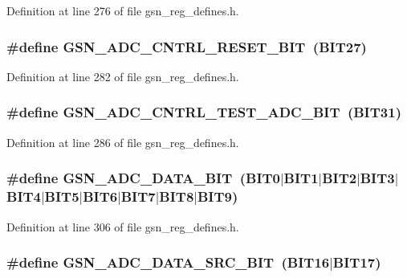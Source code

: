 Definition at line 276 of file gsn\_\-reg\_\-defines.h.

\hypertarget{a00546_a0fc6f6aa9f2c82b8c88736603f42b6cd}{
\subsubsection[{GSN\_\-ADC\_\-CNTRL\_\-RESET\_\-BIT}]{\setlength{\rightskip}{0pt plus 5cm}\#define GSN\_\-ADC\_\-CNTRL\_\-RESET\_\-BIT~(BIT27)}}
\label{a00546_a0fc6f6aa9f2c82b8c88736603f42b6cd}


Definition at line 282 of file gsn\_\-reg\_\-defines.h.

\hypertarget{a00546_aab5f311c3b1d2f7dab79d1f7a990ef0d}{
\subsubsection[{GSN\_\-ADC\_\-CNTRL\_\-TEST\_\-ADC\_\-BIT}]{\setlength{\rightskip}{0pt plus 5cm}\#define GSN\_\-ADC\_\-CNTRL\_\-TEST\_\-ADC\_\-BIT~(BIT31)}}
\label{a00546_aab5f311c3b1d2f7dab79d1f7a990ef0d}


Definition at line 286 of file gsn\_\-reg\_\-defines.h.

\hypertarget{a00546_aca0bee2cec66890da6f7a254341d5b25}{
\subsubsection[{GSN\_\-ADC\_\-DATA\_\-BIT}]{\setlength{\rightskip}{0pt plus 5cm}\#define GSN\_\-ADC\_\-DATA\_\-BIT~(BIT0$|$BIT1$|$BIT2$|$BIT3$|$BIT4$|$BIT5$|$BIT6$|$BIT7$|$BIT8$|$BIT9)}}
\label{a00546_aca0bee2cec66890da6f7a254341d5b25}


Definition at line 306 of file gsn\_\-reg\_\-defines.h.

\hypertarget{a00546_a3d8d67e6f614ba0e4932e0901848264c}{
\subsubsection[{GSN\_\-ADC\_\-DATA\_\-SRC\_\-BIT}]{\setlength{\rightskip}{0pt plus 5cm}\#define GSN\_\-ADC\_\-DATA\_\-SRC\_\-BIT~(BIT16$|$BIT17)}}
\label{a00546_a3d8d67e6f614ba0e4932e0901848264c}


